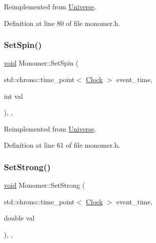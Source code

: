 Reimplemented from \mbox{\hyperlink{class_universe_ae0cb8d86b2fbb8396d605160344b42f5}{Universe}}.



Definition at line 80 of file monomer.\+h.

\mbox{\label{class_monomer_ad24a86a4c1ac62d1b0ce8040d6b08adf}} 
\subsubsection{\texorpdfstring{Set\+Spin()}{SetSpin()}}
{\footnotesize\ttfamily \mbox{\hyperlink{glad_8h_a950fc91edb4504f62f1c577bf4727c29}{void}} Monomer\+::\+Set\+Spin (\begin{DoxyParamCaption}\item[{std\+::chrono\+::time\+\_\+point$<$ \mbox{\hyperlink{universe_8h_a0ef8d951d1ca5ab3cfaf7ab4c7a6fd80}{Clock}} $>$}]{event\+\_\+time,  }\item[{int}]{val }\end{DoxyParamCaption})\hspace{0.3cm}{\ttfamily [inline]}, {\ttfamily [final]}, {\ttfamily [virtual]}}



Reimplemented from \mbox{\hyperlink{class_universe_ae2ae1c3b3e4cde2c18f5f6a814761ec8}{Universe}}.



Definition at line 61 of file monomer.\+h.

\mbox{\label{class_monomer_a10b864f6bcad43f11a2316dbbe4c4742}} 
\subsubsection{\texorpdfstring{Set\+Strong()}{SetStrong()}}
{\footnotesize\ttfamily \mbox{\hyperlink{glad_8h_a950fc91edb4504f62f1c577bf4727c29}{void}} Monomer\+::\+Set\+Strong (\begin{DoxyParamCaption}\item[{std\+::chrono\+::time\+\_\+point$<$ \mbox{\hyperlink{universe_8h_a0ef8d951d1ca5ab3cfaf7ab4c7a6fd80}{Clock}} $>$}]{event\+\_\+time,  }\item[{double}]{val }\end{DoxyParamCaption})\hspace{0.3cm}{\ttfamily [inline]}, {\ttfamily [final]}, {\ttfamily [virtual]}}



